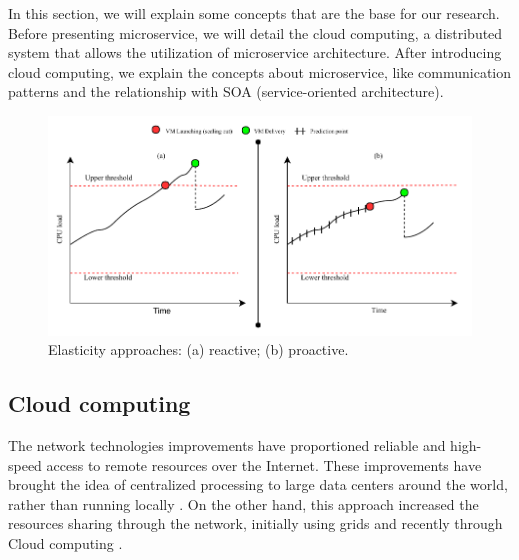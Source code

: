 In this section, we will explain some concepts that are the base for our research. Before presenting microservice, we will detail the cloud computing, a distributed system that allows the utilization of microservice architecture. After introducing cloud computing, we explain the concepts about microservice, like communication patterns and the relationship with SOA (service-oriented architecture).




\begin{figure}[ht]
\centering
\includegraphics{Images/Previsto_real.pdf}
\caption{Elasticity approaches: (a) reactive; (b) proactive.}
\label{previsto}
\end{figure}

\subsection{Cloud computing}
The network technologies improvements have proportioned reliable and high-speed access to remote resources over the Internet. These improvements have brought the idea of centralized processing to large data centers around the world, rather than running locally \cite{Marinescu2013CloudPractice}. On the other hand, this approach increased the resources sharing through the network, initially using grids and recently through Cloud computing \citep{Marinescu2013CloudPractice}.

